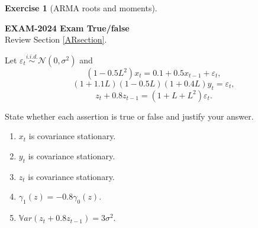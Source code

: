\documentclass[
  11pt,
]{book}
\providecommand{\tightlist}{%
  \setlength{\itemsep}{0pt}\setlength{\parskip}{0pt}}
\theoremstyle{definition}
\theoremstyle{definition}
\theoremstyle{definition}
\newtheorem{exercise}{Exercise}[chapter]
\theoremstyle{definition}
\theoremstyle{remark}
\begin{document}
\begin{exercisebox}

\begin{exercise}[ARMA roots and moments]
\protect\hypertarget{exr:ex-exam2024-arma-roots}{}\label{exr:ex-exam2024-arma-roots}

\textbf{EXAM-2024 \textbar{} Exam \textbar{} True/false}\\
Review Section \ref{ARsection}.

Let \(\varepsilon_t\overset{i.i.d.}{\sim}\mathcal N(0,\sigma^2)\) and
\[
(1-0.5L^2)x_t=0.1+0.5x_{t-1}+\varepsilon_t,
\]
\[
(1+1.1L)(1-0.5L)(1+0.4L)y_t=\varepsilon_t,
\]
\[
z_t+0.8z_{t-1}=(1+L+L^2)\varepsilon_t.
\]

State whether each assertion is true or false and justify your answer.

\begin{enumerate}
\def\labelenumi{\arabic{enumi}.}
\tightlist
\item
  \(x_t\) is covariance stationary.
\item
  \(y_t\) is covariance stationary.
\item
  \(z_t\) is covariance stationary.
\item
  \(\gamma_1(z)=-0.8\gamma_0(z)\).
\item
  \(\mathbb{V}ar(z_t+0.8z_{t-1})=3\sigma^2\).
\end{enumerate}

\end{exercise}

\end{exercisebox}

\end{document}
